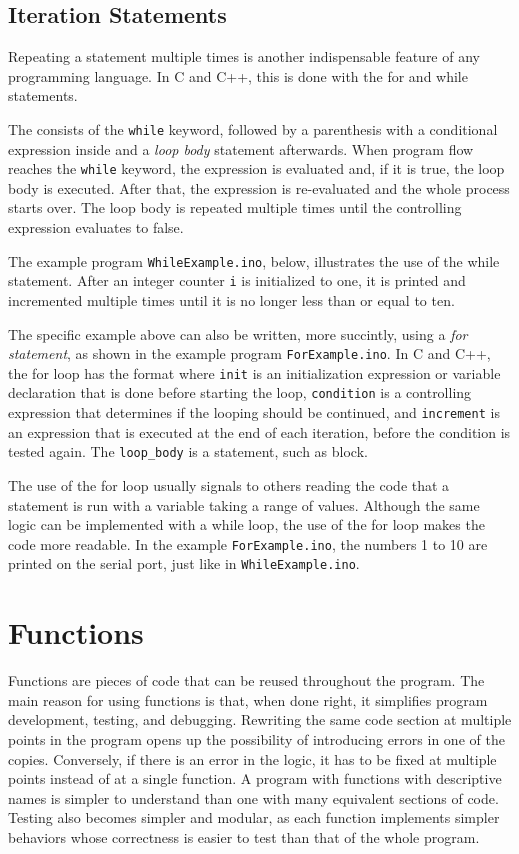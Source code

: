 \subsection{Iteration Statements}
Repeating a statement multiple times is another indispensable feature of any programming language.
In C and C++, this is done with the for and while statements.

The  consists of the \texttt{while} keyword, followed by a parenthesis with a conditional expression inside and a \emph{loop body} statement afterwards.
When program flow reaches the \texttt{while} keyword, the expression is evaluated and, if it is true, the loop body is executed.
After that, the expression is re-evaluated and the whole process starts over.
The loop body is repeated multiple times until the controlling expression evaluates to false.

The example program \texttt{WhileExample.ino}, below, illustrates the use of the while statement.
After an integer counter \texttt{i} is initialized to one, it is printed and incremented multiple times until it is no longer less than or equal to ten.


The specific example above can also be written, more succintly, using a \emph{for statement}, as shown in the example program \texttt{ForExample.ino}.
In C and C++, the for loop has the format  where \texttt{init} is an initialization expression or variable declaration that is done before starting the loop, \texttt{condition} is a controlling expression that determines if the looping should be continued, and \texttt{increment} is an expression that is executed at the end of each iteration, before the condition is tested again.
The \texttt{loop\_body} is a statement, such as block.


The use of the for loop usually signals to others reading the code that a statement is run with a variable taking a range of values.
Although the same logic can be implemented with a while loop, the use of the for loop makes the code more readable.
In the example \texttt{ForExample.ino}, the numbers 1 to 10 are printed on the serial port, just like in \texttt{WhileExample.ino}.

\section{Functions}
Functions are pieces of code that can be reused throughout the program.
The main reason for using functions is that, when done right, it simplifies program development, testing, and debugging.
Rewriting the same code section at multiple points in the program opens up the possibility of introducing errors in one of the copies.
Conversely, if there is an error in the logic, it has to be fixed at multiple points instead of at a single function.
A program with functions with descriptive names is simpler to understand than one with many equivalent sections of code.
Testing also becomes simpler and modular, as each function implements simpler behaviors whose correctness is easier to test than that of the whole program.

